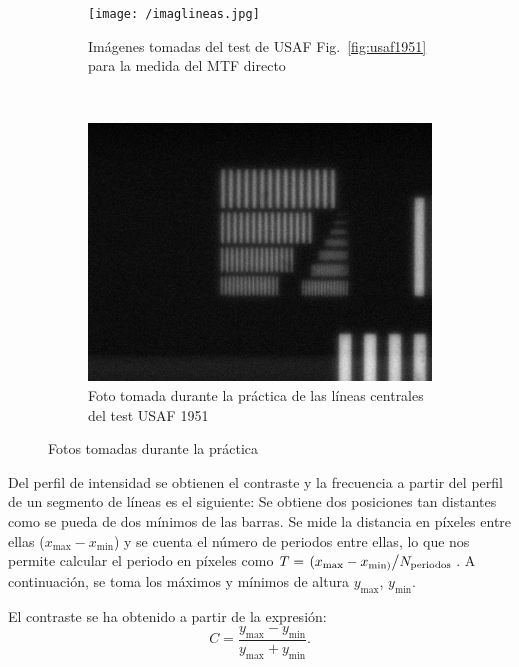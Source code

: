 \documentclass{./packages/optica-article}
\begin{document}
\begin{figure}[h]
	\centering
	\begin{subfigure}[t]{0.576\textwidth}\centering
		\texttt{[image: /imaglineas.jpg]}
		\caption{Imágenes tomadas del test de USAF Fig.~\ref{fig:usaf1951} para la medida del MTF directo}\label{fig:images:example}
	\end{subfigure}
	\,
	\begin{subfigure}[t]{0.4\textwidth}\centering
		\includegraphics[width=\textwidth]{smallest_lines}
		\caption{Foto tomada durante la práctica de las líneas centrales del test USAF 1951}\label{fig:usafpic}
	\end{subfigure}
	\caption{Fotos tomadas durante la práctica}\label{fig:group:usaf}
\end{figure}


Del perfil de intensidad se obtienen el contraste y la frecuencia a partir del perfil de un segmento de líneas es el siguiente: Se obtiene dos posiciones tan distantes como se pueda de dos mínimos de las barras. Se mide la distancia en píxeles entre ellas ($x_{\max} - x_{\min} $) y se cuenta el número de periodos entre ellas, lo que nos permite calcular el periodo en píxeles como $T = \flatfrac{(x_{\max} - x_{\min)} }{N_{\textrm{periodos}}}$. A continuación,  se toma los máximos y mínimos de altura $y_{\max}$, $y_{\min}$.

El contraste se ha obtenido a partir de la expresión:
\nopagebreak
\begin{equation}
	C = \frac{y_{\max} - y_{\min}}{y_{\max} + y_{\min}}.
	\label{eq:contraste}
\end{equation}
\end{document}
